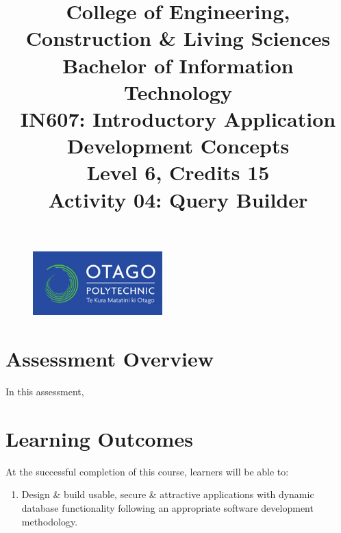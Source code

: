\documentclass{article}
\author{}
\begin{document}
\begin{figure}
    \centering
    \includegraphics[width=50mm]{../../resources/img/logo.png}
\end{figure}

\title{College of Engineering, Construction \& Living Sciences\\Bachelor of Information Technology\\IN607: Introductory Application Development Concepts\\Level 6, Credits 15\\\textbf{Activity 04: Query Builder}}
\date{}
\maketitle

\section*{Assessment Overview}
In this assessment, 

\section*{Learning Outcomes}
At the successful completion of this course, learners will be able to: 
\begin{enumerate}
	\item Design \& build usable, secure \& attractive applications with dynamic database functionality following an appropriate software development methodology.
\end{enumerate} 
\end{document}
